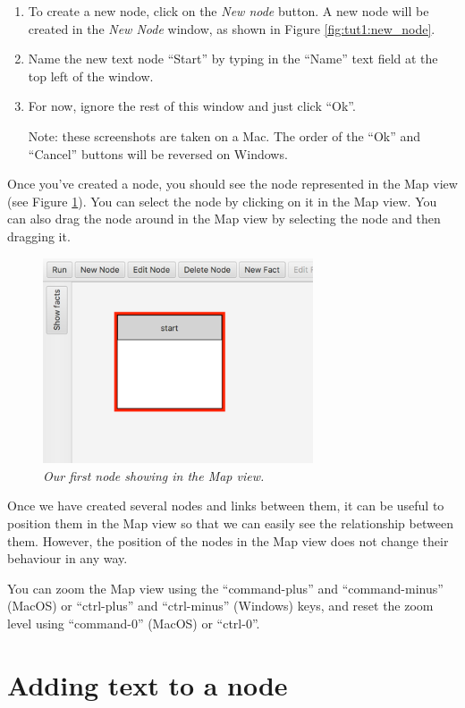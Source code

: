 \documentclass{article}
\begin{document}
\begin{enumerate}
  \item To create a new node, click on the \textit{New node} button. A new node will be created in the \textit{New Node} window, as shown in Figure \ref{fig:tut1:new_node}.
  \item Name the new text node ``Start'' by typing in the ``Name'' text field at the top left of the window. 
  \item For now, ignore the rest of this window and just click ``Ok''.
  
  Note: these screenshots are taken on a Mac. The order of the ``Ok'' and ``Cancel'' buttons will be reversed on Windows.
\end{enumerate}
 
Once you've created a node, you should see the node represented in the Map view (see Figure \ref{fig:tut1:first_node}). You can select the
node by clicking on it in the Map view. You can also drag the node around in the Map view by selecting the node and then dragging it. 

\begin{figure}[ht]
  \centering \includegraphics[width=8cm]{images/hypedyn-tutorial-1-figure-4}
  \caption{\textit{Our first node showing in the Map view.}}
  \label{fig:tut1:first_node}
\end{figure} 

Once we have created several nodes and links between them, it can be useful to position them in the Map view so that we can easily see the relationship between them. However, the position of the nodes in the Map view does not change their behaviour in any way. 

You can zoom the Map view using the ``command-plus'' and ``command-minus'' (MacOS) or ``ctrl-plus'' and ``ctrl-minus'' (Windows) keys, and reset the zoom level using ``command-0'' (MacOS) or ``ctrl-0''.

\section{Adding text to a node}
\end{document}
